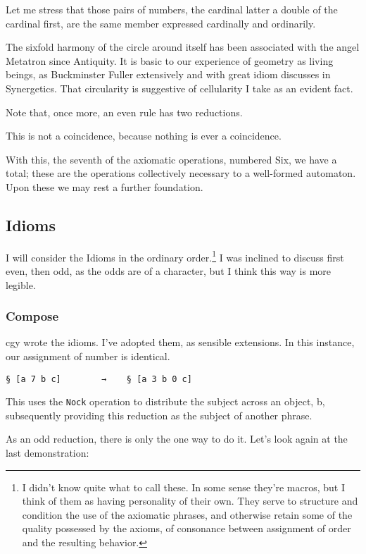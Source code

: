 \documentclass[twoside]{article}
\begin{document}
Let me stress that those pairs of numbers, the cardinal latter a double of the cardinal first, are the same member expressed cardinally and ordinarily.

The sixfold harmony of the circle around itself has been associated with the angel Metatron since Antiquity. It is basic to our experience of geometry as living beings, as Buckminster Fuller extensively and with great idiom discusses in Synergetics. That circularity is suggestive of cellularity I take as an evident fact.

Note that, once more, an even rule has two reductions.

This is not a coincidence, because nothing is ever a coincidence.

With this, the seventh of the axiomatic operations, numbered Six, we have a total; these are the operations collectively necessary to a well-formed automaton. Upon these we may rest a further foundation.

\subsection{Idioms}

I will consider the Idioms in the ordinary order.\footnote{I didn't know quite what to call these. In some sense they're macros, but I think of them as having personality of their own. They serve to structure and condition the use of the axiomatic phrases, and otherwise retain some of the quality possessed by the axioms, of consonance between assignment of order and the resulting behavior.} I was inclined to discuss first even, then odd, as the odds are of a character, but I think this way is more legible.

\subsubsection{Compose}

cgy wrote the idioms. I've adopted them, as sensible extensions. In this instance, our assignment of number is identical.

\begin{lstlisting}[style=listingblock]
§ [a 7 b c]        →    § [a 3 b 0 c]
\end{lstlisting}

This uses the \texttt{Nock} operation to distribute the subject across an object, b, subsequently providing this reduction as the subject of another phrase.

As an odd reduction, there is only the one way to do it. Let's look again at the last demonstration:
\end{document}
